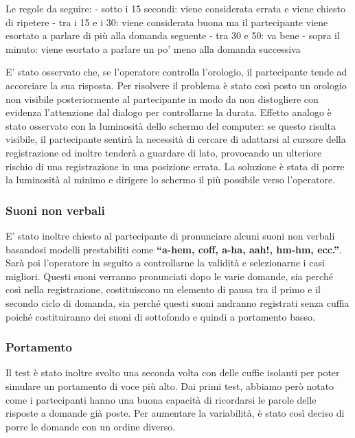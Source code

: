 \documentclass[
]{article}
\begin{document}
Le regole da seguire: - sotto i 15 secondi: viene considerata errata e viene chiesto di ripetere - tra i 15 e i 30: viene considerata buona ma il partecipante viene esortato a parlare di più alla domanda seguente - tra 30 e 50: va bene - sopra il minuto: viene esortato a parlare un po' meno alla domanda successiva

E' stato osservato che, se l'operatore controlla l'orologio, il partecipante tende ad accorciare la sua risposta. Per risolvere il problema è stato così posto un orologio non visibile posteriormente al partecipante in modo da non distogliere con evidenza l'attenzione dal dialogo per controllarne la durata. Effetto analogo è stato osservato con la luminosità dello schermo del computer: se questo risulta visibile, il partecipante sentirà la necessità di cercare di adattarsi al cursore della registrazione ed inoltre tenderà a guardare di lato, provocando un ulteriore rischio di una registrazione in una posizione errata. La soluzione è stata di porre la luminosità al minimo e dirigere lo schermo il più possibile verso l'operatore.

\subsubsection{Suoni non verbali}\label{suoni-non-verbali}

E' stato inoltre chiesto al partecipante di pronunciare alcuni suoni non verbali basandosi modelli prestabiliti come \textbf{``a-hem, coff, a-ha, aah!, hm-hm, ecc.''}. Sarà poi l'operatore in seguito a controllarne la validità e selezionarne i casi migliori. Questi suoni verranno pronunciati dopo le varie domande, sia perché così nella registrazione, costituiscono un elemento di pausa tra il primo e il secondo ciclo di domanda, sia perché questi suoni andranno registrati senza cuffia poiché costituiranno dei suoni di sottofondo e quindi a portamento basso.

\subsubsection{Portamento}\label{portamento}

Il test è stato inoltre svolto una seconda volta con delle cuffie isolanti per poter simulare un portamento di voce più alto. Dai primi test, abbiamo però notato come i partecipanti hanno una buona capacità di ricordarsi le parole delle risposte a domande già poste. Per aumentare la variabilità, è stato così deciso di porre le domande con un ordine diverso.
\end{document}
